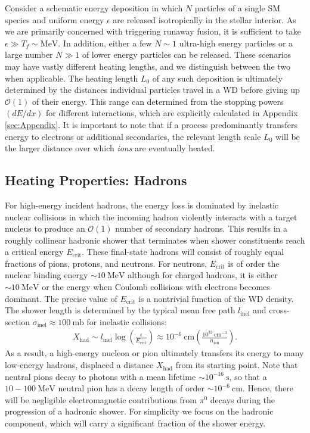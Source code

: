 \documentclass[twocolumn,preprintnumbers,amsmath,amssymb,prd, superscriptaddress]{revtex4} %
\newcommand{\OO}{\mathcal{O}}
\newcommand{\MeV}{\text{MeV}}
\def\r{\right)}
\def\l{\left(}
\begin{document}
Consider a schematic energy deposition in which $N$ particles of a single SM species and uniform energy $\epsilon$ are released isotropically in the stellar interior.
As we are primarily concerned with triggering runaway fusion, it is sufficient to take $\epsilon \gg T_f \sim \text{MeV}$.
In addition, either a few $N \sim 1$ ultra-high energy particles or a large number $N \gg 1$ of lower energy particles can be released.
These scenarios may have vastly different heating lengths, and we distinguish between the two when applicable.
The heating length $L_0$ of any such deposition is ultimately determined by the distances individual particles travel in a WD before giving up $\OO(1)$ of their energy.
This range can determined from the stopping powers $(dE/dx)$ for different interactions, which are explicitly calculated in Appendix \ref{sec:Appendix}.
It is important to note that if a process predominantly transfers energy to electrons or additional secondaries, the relevant length scale $L_0$ will be the larger distance over which \emph{ions} are eventually heated.

\subsection{Heating Properties: Hadrons}

For high-energy incident hadrons, the energy loss is dominated by inelastic nuclear collisions in which the incoming hadron violently interacts with a target nucleus to produce an $\OO(1)$ number of secondary hadrons.
This results in a roughly collinear hadronic shower that terminates when shower constituents reach a critical energy $E_\text{crit}$.
These final-state hadrons will consist of roughly equal fractions of pions, protons, and neutrons.
For neutrons, $E_\text{crit}$ is of order the nuclear binding energy $\sim 10 ~\text{MeV}$ although for charged hadrons, it is either $\sim 10 ~\MeV$ or the energy when Coulomb collisions with electrons becomes dominant.
The precise value of $E_\text{crit}$ is a nontrivial function of the WD density.
The shower length is determined by the typical mean free path $l_\text{inel}$ and cross-section $\sigma_\text{inel} \approx 100 ~\text{mb}$ for inelastic collisions:
\begin{align}
\label{eq:hadlength}
  X_\text{had} \sim l_\text{inel} \log\l\frac{\epsilon}{E_\text{crit}}\r
  \approx 10^{-6} ~\text{cm} \l\frac{10^{32}~\text{cm}^{-3}}{n_\text{ion}}\r.
\end{align}
As a result, a high-energy nucleon or pion ultimately transfers its energy to many low-energy hadrons, displaced a distance $X_\text{had}$ from its starting point.
Note that neutral pions decay to photons with a mean lifetime $\sim 10^{-16} ~\text{s}$, so that a $10 - 100 ~\text{MeV}$ neutral pion has a decay length of order $\sim 10^{-6} ~\text{cm}$.
Hence, there will be negligible electromagnetic contributions from $\pi^0$ decays during the progression of a hadronic shower.
For simplicity we focus on the hadronic component, which will carry a significant fraction of the shower energy.
\end{document}
